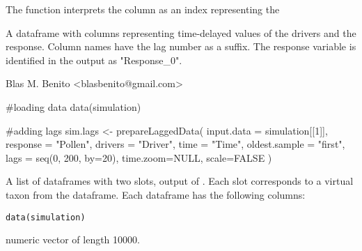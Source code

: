 \documentclass[letterpaper]{book}
\begin{document}
%
\begin{Details}\relax
The function interprets the  column as an index representing the
\end{Details}
%
\begin{Value}
A dataframe with columns representing time-delayed values of the drivers and the response. Column names have the lag number as a suffix. The response variable is identified in the output as "Response\_0".
\end{Value}
%
\begin{Author}\relax
Blas M. Benito  <blasbenito@gmail.com>
\end{Author}
%
\begin{SeeAlso}\relax
{}
\end{SeeAlso}
%
\begin{Examples}
\begin{ExampleCode}
#loading data
data(simulation)

#adding lags
sim.lags <- prepareLaggedData(
  input.data = simulation[[1]],
  response = "Pollen",
  drivers = "Driver",
  time = "Time",
  oldest.sample = "first",
  lags = seq(0, 200, by=20),
  time.zoom=NULL,
  scale=FALSE
  )

\end{ExampleCode}
\end{Examples}
%
\begin{Description}\relax
A list of dataframes with two slots, output of . Each slot corresponds to a virtual taxon from the  dataframe. Each dataframe has the following columns:
\end{Description}
%
\begin{Usage}
\begin{verbatim}
data(simulation)
\end{verbatim}
\end{Usage}
%
\begin{Format}
numeric vector of length 10000.
\end{Format}
%
\end{document}
